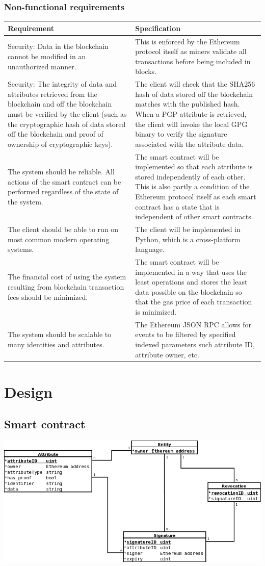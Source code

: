 \documentclass[a4paper]{report}
\begin{document}
	\subsection{Non-functional requirements}	
	\begin{longtable}{|p{5.5cm}|p{5.5cm}|}
		\hline
		\textbf{Requirement} & \textbf{Specification} \\ \hline
		Security: Data in the blockchain cannot be modified in an unauthorized manner. & This is enforced by the Ethereum protocol itself as miners validate all transactions before being included in blocks. \\ \hline
		Security: The integrity of data and attributes retrieved from the blockchain and off the blockchain must be verified by the client (such as the cryptographic hash of data stored off the blockchain and proof of ownership of cryptographic keys). & The client will check that the SHA256 hash of data stored off the blockchain matches with the published hash. When a PGP attribute is retrieved, the client will invoke the local GPG binary to verify the signature associated with the attribute data. \\ \hline
		The system should be reliable. All actions of the smart contract can be performed regardless of the state of the system. & The smart contract will be implemented so that each attribute is stored independently of each other. This is also partly a condition of the Ethereum protocol itself as each smart contract has a state that is independent of other smart contracts. \\ \hline
		The client should be able to run on most common modern operating systems. & The client will be implemented in Python, which is a cross-platform language. \\ \hline
		The financial cost of using the system resulting from blockchain transaction fees should be minimized. & The smart contract will be implemented in a way that uses the least operations and stores the least data possible on the blockchain so that the gas price of each transaction is minimized. \\ \hline
		The system should be scalable to many identities and attributes. & The Ethereum JSON RPC allows for events to be filtered by specified indexed parameters such attribute ID, attribute owner, etc. \\ \hline
	\end{longtable}
	
	\chapter{Design}
	\section{Smart contract}
	\includegraphics[width=\textwidth,height=\textheight,keepaspectratio]{"Trusty smart contract ER diagram"}
	
	
	
\end{document}
